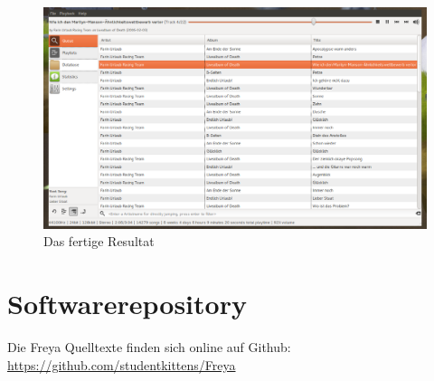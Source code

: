 \documentclass[11pt]{scrreprt}
\begin{document}
\begin{figure}[htb!]
    \centering
    \includegraphics[scale=0.66,angle=90]{./gfx/misc/final_result.png}
    \caption{Das fertige Resultat}
    \label{pic_final_result}
\end{figure}

\chapter{Softwarerepository}
Die Freya Quelltexte finden sich online auf Github:
\\
\url{https://github.com/studentkittens/Freya}
\end{document}
